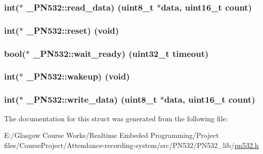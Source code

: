 \subsubsection[{read\+\_\+data}]{\setlength{\rightskip}{0pt plus 5cm}int($\ast$ \+\_\+\+P\+N532\+::read\+\_\+data) (uint8\+\_\+t $\ast$data, uint16\+\_\+t count)}\label{struct___p_n532_afc7ae4525260c8a72672783991e0adab}
\hypertarget{struct___p_n532_a2f4dc7d481f5d772469a6f8ab76e2329}{}
\subsubsection[{reset}]{\setlength{\rightskip}{0pt plus 5cm}int($\ast$ \+\_\+\+P\+N532\+::reset) (void)}\label{struct___p_n532_a2f4dc7d481f5d772469a6f8ab76e2329}
\hypertarget{struct___p_n532_a5ad6a00a367abc72a4ff25d61e0457a9}{}
\subsubsection[{wait\+\_\+ready}]{\setlength{\rightskip}{0pt plus 5cm}bool($\ast$ \+\_\+\+P\+N532\+::wait\+\_\+ready) (uint32\+\_\+t timeout)}\label{struct___p_n532_a5ad6a00a367abc72a4ff25d61e0457a9}
\hypertarget{struct___p_n532_a8995878138fba93d7893bb0144b77b56}{}
\subsubsection[{wakeup}]{\setlength{\rightskip}{0pt plus 5cm}int($\ast$ \+\_\+\+P\+N532\+::wakeup) (void)}\label{struct___p_n532_a8995878138fba93d7893bb0144b77b56}
\hypertarget{struct___p_n532_ae8b43a07bdf0ac204645a94e553ed810}{}
\subsubsection[{write\+\_\+data}]{\setlength{\rightskip}{0pt plus 5cm}int($\ast$ \+\_\+\+P\+N532\+::write\+\_\+data) (uint8\+\_\+t $\ast$data, uint16\+\_\+t count)}\label{struct___p_n532_ae8b43a07bdf0ac204645a94e553ed810}


The documentation for this struct was generated from the following file\+:\begin{DoxyCompactItemize}
\item 
E\+:/\+Glasgow Course Works/\+Realtime Embeded Programming/\+Project files/\+Course\+Project/\+Attendance-\/recording-\/system/src/\+P\+N532/\+P\+N532\+\_\+lib/\hyperlink{pn532_8h}{pn532.\+h}\end{DoxyCompactItemize}
